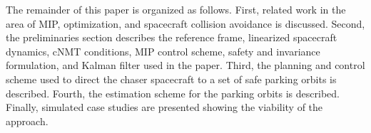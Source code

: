 \documentclass[twocolumn,letterpaper]{IEEEAerospaceCLS}  %
\theoremstyle{definition}
\begin{document}

The remainder of this paper is organized as follows. First, related work in the area of MIP, optimization, and spacecraft collision avoidance is discussed. Second, the preliminaries section describes the reference frame, linearized spacecraft dynamics, cNMT conditions, MIP control scheme, safety and invariance formulation, and Kalman filter used in the paper. Third, the planning and control scheme used to direct the chaser spacecraft to a set of safe parking orbits is described. Fourth, the estimation scheme for the parking orbits is described. Finally, simulated case studies are presented showing the viability of the approach.





\end{document}
